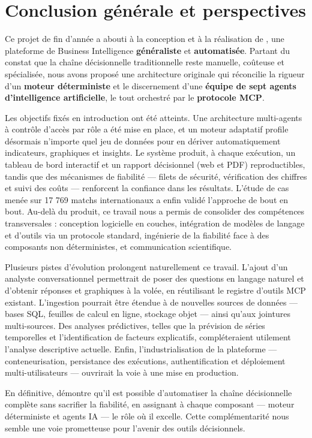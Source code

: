 \chapter*{Conclusion générale et perspectives}

Ce projet de fin d'année a abouti à la conception et à la réalisation de
\textbf{\montitre}, une plateforme de Business Intelligence \textbf{généraliste}
et \textbf{automatisée}. Partant du constat que la chaîne décisionnelle
traditionnelle reste manuelle, coûteuse et spécialisée, nous avons proposé une
architecture originale qui réconcilie la rigueur d'un \textbf{moteur
déterministe} et le discernement d'une \textbf{équipe de sept agents
d'intelligence artificielle}, le tout orchestré par le \textbf{protocole MCP}.

Les objectifs fixés en introduction ont été atteints. Une architecture
multi-agents à contrôle d'accès par rôle a été mise en place, et un moteur
adaptatif profile désormais n'importe quel jeu de données pour en dériver
automatiquement indicateurs, graphiques et insights. Le système produit, à
chaque exécution, un tableau de bord interactif et un rapport décisionnel
(web et PDF) reproductibles, tandis que des mécanismes de fiabilité — filets
de sécurité, vérification des chiffres et suivi des coûts — renforcent la
confiance dans les résultats. L'étude de cas menée sur 17 769 matchs
internationaux a enfin validé l'approche de bout en bout. Au-delà du produit,
ce travail nous a permis de consolider des compétences transversales :
conception logicielle en couches, intégration de modèles de langage et d'outils
via un protocole standard, ingénierie de la fiabilité face à des composants non
déterministes, et communication scientifique.

Plusieurs pistes d'évolution prolongent naturellement ce travail. L'ajout d'un
analyste conversationnel permettrait de poser des questions en langage naturel
et d'obtenir réponses et graphiques à la volée, en réutilisant le registre
d'outils MCP existant. L'ingestion pourrait être étendue à de nouvelles sources
de données — bases SQL, feuilles de calcul en ligne, stockage objet — ainsi
qu'aux jointures multi-sources. Des analyses prédictives, telles que la
prévision de séries temporelles et l'identification de facteurs explicatifs,
compléteraient utilement l'analyse descriptive actuelle. Enfin,
l'industrialisation de la plateforme — conteneurisation, persistance des
exécutions, authentification et déploiement multi-utilisateurs — ouvrirait la
voie à une mise en production.

En définitive, \textbf{\montitre} démontre qu'il est possible d'automatiser la
chaîne décisionnelle complète sans sacrifier la fiabilité, en assignant à
chaque composant — moteur déterministe et agents IA — le rôle où il excelle.
Cette complémentarité nous semble une voie prometteuse pour l'avenir des
outils décisionnels.
